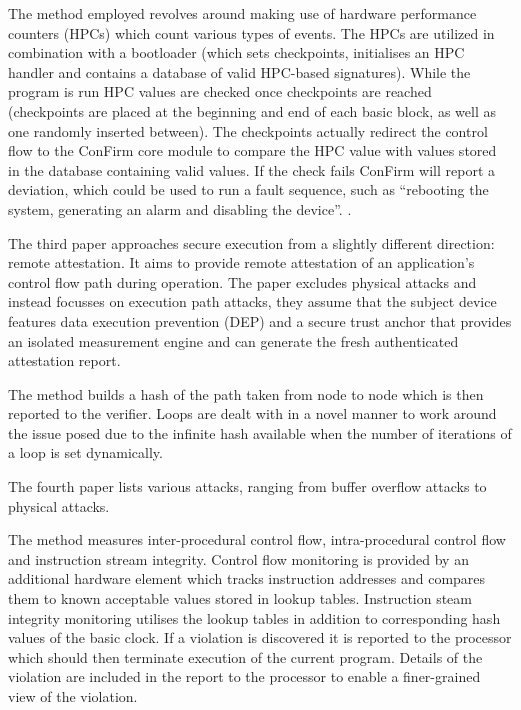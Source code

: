The method employed revolves around making use of hardware performance counters (HPCs) which count various types of events. The HPCs are utilized in combination with a bootloader (which sets checkpoints, initialises an HPC handler and contains a database of valid HPC-based signatures). While the program is run HPC values are checked once checkpoints are reached (checkpoints are placed at the beginning and end of each basic block, as well as one randomly inserted between). The checkpoints actually redirect the control flow to the ConFirm core module to compare the HPC value with values stored in the database containing valid values. If the check fails ConFirm will report a deviation, which could be used to run a fault sequence, such as ``rebooting the system, generating an alarm and disabling the device''. .

The third paper \cite{Abera2016} approaches secure execution from a slightly different direction: remote attestation. It aims to provide remote attestation of an application's control flow path during operation. The paper excludes physical attacks and instead focusses on execution path attacks, they assume that the subject  device features data  execution prevention (DEP) and a secure trust anchor that provides an isolated measurement engine and can generate the fresh authenticated attestation report.

The method builds a hash of the path taken from node to node which is then reported to the verifier.  Loops are dealt with in a novel manner to work around the issue posed due to the infinite hash available when the number of iterations of a loop is set dynamically.

The fourth paper \cite{Arora2006} lists various attacks, ranging from buffer overflow attacks to physical attacks.

The method measures inter-procedural control flow, intra-procedural control flow and instruction stream integrity. Control flow monitoring is provided by an additional hardware element which tracks instruction addresses and compares them to known acceptable values stored in lookup tables. Instruction steam integrity monitoring utilises the lookup tables in addition to corresponding hash values of the basic clock. If a violation is discovered it is reported to the processor which should then terminate execution of the current program. Details of the violation are included in the report to the processor to enable a finer-grained view of the violation.

